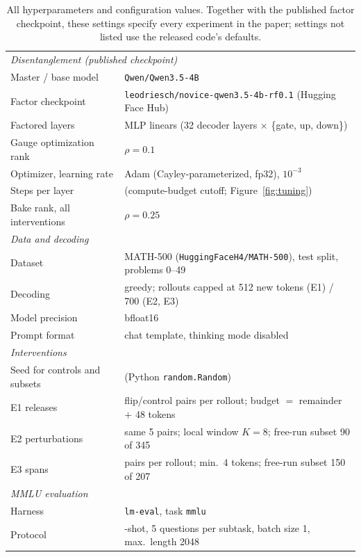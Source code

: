 \documentclass[9pt]{article}
\begin{document}
\begin{table}[H]
  \centering
  \caption{All hyperparameters and configuration values. Together with the
    published factor checkpoint, these settings specify every experiment in
    the paper; settings not listed use the released code's defaults.}
  \label{tab:hparams}
  \begin{tabularx}{\textwidth}{l >{\raggedright\arraybackslash}X}
    \toprule
    \multicolumn{2}{l}{\emph{Disentanglement (published checkpoint)}} \\
    Master / base model & \texttt{Qwen/Qwen3.5-4B} \\
    Factor checkpoint & \texttt{leodriesch/novice-qwen3.5-4b-rf0.1} (Hugging Face Hub) \\
    Factored layers & 96 MLP linears (32 decoder layers $\times$ \{gate, up, down\}) \\
    Gauge optimization rank & $\rho = 0.1$ \\
    Optimizer, learning rate & Adam (Cayley-parameterized, fp32), $10^{-3}$ \\
    Steps per layer & 40 (compute-budget cutoff; Figure~\ref{fig:tuning}) \\
    Bake rank, all interventions & $\rho = 0.25$ \\
    \midrule
    \multicolumn{2}{l}{\emph{Data and decoding}} \\
    Dataset & MATH-500 (\texttt{HuggingFaceH4/MATH-500}), test split, problems 0--49 \\
    Decoding & greedy; rollouts capped at 512 new tokens (E1) / 700 (E2, E3) \\
    Model precision & bfloat16 \\
    Prompt format & chat template, thinking mode disabled \\
    \midrule
    \multicolumn{2}{l}{\emph{Interventions}} \\
    Seed for controls and subsets & 0 (Python \texttt{random.Random}) \\
    E1 releases & 5 flip/control pairs per rollout; budget $=$ remainder $+$ 48 tokens \\
    E2 perturbations & same 5 pairs; local window $K = 8$; free-run subset 90 of 345 \\
    E3 spans & 3 pairs per rollout; min.\ 4 tokens; free-run subset 150 of 207 \\
    \midrule
    \multicolumn{2}{l}{\emph{MMLU evaluation}} \\
    Harness & \texttt{lm-eval}, task \texttt{mmlu} \\
    Protocol & 5-shot, 5 questions per subtask, batch size 1, max.\ length 2048 \\
    \bottomrule
  \end{tabularx}
\end{table}
\end{document}
